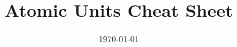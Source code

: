 \documentclass[12pt, a4paper]{ltjsarticle}
\title{Atomic Units Cheat Sheet}
\author{}
\date{\today}
\begin{document}
\maketitle

%

\section{}

%
%
\end{document}

